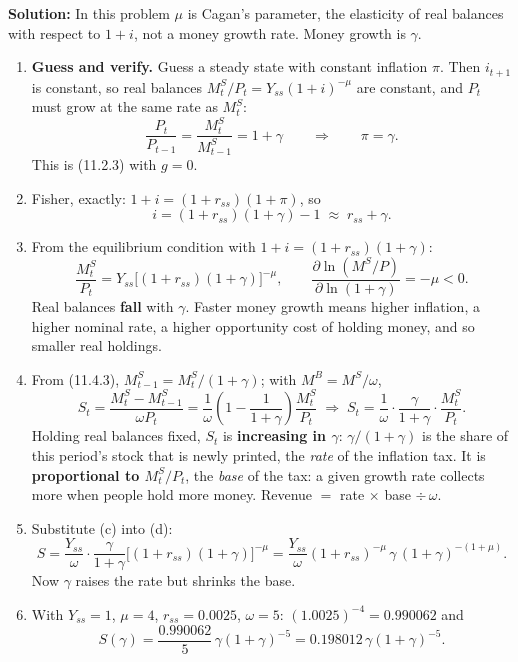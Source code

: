 \documentclass[12pt, letterpaper]{article}
\newcommand{\Ms}{M^{S}}
\newcommand{\MBase}{M^{B}}
\begin{document}
\begin{tcolorbox}[evenbox,title={Problem 11.6 \quad Seignorage with High Inflation}]
\textbf{Solution:} In this problem $\mu$ is Cagan's parameter, the elasticity of real balances
with respect to $1+i$, not a money growth rate. Money growth is $\gamma$.

\begin{enumerate}
\item \textbf{Guess and verify.} Guess a steady state with constant inflation $\pi$. Then
$i_{t+1}$ is constant, so real balances $\Ms_t/P_t=Y_{ss}(1+i)^{-\mu}$ are constant, and $P_t$
must grow at the same rate as $\Ms_t$:
\[
\frac{P_t}{P_{t-1}}=\frac{\Ms_t}{\Ms_{t-1}}=1+\gamma
\qquad\Longrightarrow\qquad\boxed{\pi=\gamma.}
\]
This is (11.2.3) with $g=0$.

\item Fisher, exactly: $1+i=(1+r_{ss})(1+\pi)$, so
\[
\boxed{i=(1+r_{ss})(1+\gamma)-1\;\approx\;r_{ss}+\gamma.}
\]

\item From the equilibrium condition with $1+i=(1+r_{ss})(1+\gamma)$:
\[
\boxed{\frac{\Ms_t}{P_t}=Y_{ss}\bigl[(1+r_{ss})(1+\gamma)\bigr]^{-\mu},}
\qquad
\frac{\partial\ln(\Ms/P)}{\partial\ln(1+\gamma)}=-\mu<0 .
\]
Real balances \textbf{fall} with $\gamma$. Faster money growth means higher inflation, a higher
nominal rate, a higher opportunity cost of holding money, and so smaller real holdings.

\item From (11.4.3), $\Ms_{t-1}=\Ms_t/(1+\gamma)$; with $\MBase=\Ms/\omega$,
\[
S_t=\frac{\Ms_t-\Ms_{t-1}}{\omega P_t}=\frac{1}{\omega}\left(1-\frac{1}{1+\gamma}\right)\frac{\Ms_t}{P_t}
\;\Longrightarrow\;
\boxed{S_t=\frac{1}{\omega}\cdot\frac{\gamma}{1+\gamma}\cdot\frac{\Ms_t}{P_t}.}
\]
Holding real balances fixed, $S_t$ is \textbf{increasing in $\gamma$}: $\gamma/(1+\gamma)$ is the
share of this period's stock that is newly printed, the \emph{rate} of the inflation tax. It is
\textbf{proportional to $\Ms_t/P_t$}, the \emph{base} of the tax: a given growth rate collects
more when people hold more money. Revenue $=$ rate $\times$ base $\div\,\omega$.

\item Substitute (c) into (d):
\[
\boxed{S=\frac{Y_{ss}}{\omega}\cdot\frac{\gamma}{1+\gamma}\bigl[(1+r_{ss})(1+\gamma)\bigr]^{-\mu}
=\frac{Y_{ss}}{\omega}(1+r_{ss})^{-\mu}\,\gamma\,(1+\gamma)^{-(1+\mu)}.}
\]
Now $\gamma$ raises the rate but shrinks the base.

\item With $Y_{ss}=1$, $\mu=4$, $r_{ss}=0.0025$, $\omega=5$: $(1.0025)^{-4}=0.990062$ and
\[
S(\gamma)=\frac{0.990062}{5}\,\gamma(1+\gamma)^{-5}=0.198012\,\gamma(1+\gamma)^{-5}.
\]


\end{enumerate}
\end{tcolorbox}
\end{document}
